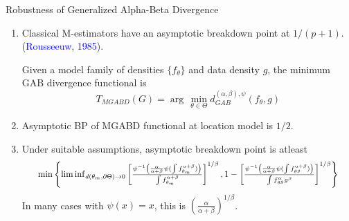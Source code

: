 \documentclass[10pt]{beamer}
\newcommand{\argmin}{\arg\,\min}
\begin{document}
\begin{frame}{Robustness of Generalized Alpha-Beta Divergence}
    \begin{enumerate}
        \item Classical M-estimators have an asymptotic breakdown point at $1/(p+1)$. (\textcolor{blue}{Rousseeuw, 1985}).
        \pause
        \begin{tcolorbox}[colback=green!5!white,colframe=green!75!black]
        Given a model family of densities $\{ f_\theta \}$ and data density $g$, the minimum GAB divergence functional is 
        \begin{equation*}
            T_{MGABD}(G) = \argmin_{\theta \in \Theta} d_{GAB}^{(\alpha,\beta),\psi}(f_\theta, g)
        \end{equation*}
         \end{tcolorbox}
        \item Asymptotic BP of MGABD functional at location model is $1/2$.
        \pause
        \item Under suitable assumptions, asymptotic breakdown point is atleast
        \begin{equation*}
            \resizebox{0.9\hsize}{!}{%
            $\min\left\{ \liminf_{d(\theta_m,\partial\Theta) \rightarrow 0} \left[\frac{\psi^{-1}\left( \frac{\alpha}{\alpha+\beta}\psi(\int f_{\theta_m}^{\alpha+\beta})\right) }{ \int f_{\theta_m}^{\alpha+\beta} }\right]^{1/\beta}, 1 - \left[\frac{\psi^{-1}\left(\frac{\alpha}{\alpha+\beta} \psi(\int f_{\theta^g}^{\alpha+\beta}) \right) }{\int f_{\theta^g}^\alpha g^\beta }\right]^{1/\beta} \right\}$%
            }
        \end{equation*}
        \noindent In many cases with $\psi(x) = x$, this is $\left( \frac{\alpha}{\alpha+\beta} \right)^{1/\beta}$. 
    \end{enumerate}
\end{frame}
\end{document}
